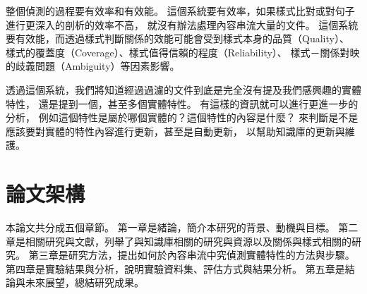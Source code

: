 整個偵測的過程要有效率和有效能。
這個系統要有效率，如果樣式比對或對句子進行更深入的剖析的效率不高，
就沒有辦法處理內容串流大量的文件。
這個系統要有效能，而透過樣式判斷關係的效能可能會受到樣式本身的品質（Quality）、
樣式的覆蓋度（Coverage）、樣式值得信賴的程度（Reliability）、
樣式－關係對映的歧義問題（Ambiguity）等因素影響。

透過這個系統，我們將知道經過過濾的文件到底是完全沒有提及我們感興趣的實體特性，
還是提到一個，甚至多個實體特性。
有這樣的資訊就可以進行更進一步的分析，
例如這個特性是屬於哪個實體的？這個特性的內容是什麼？
來判斷是不是應該要對實體的特性內容進行更新，甚至是自動更新，
以幫助知識庫的更新與維護。

%
%
\section{論文架構}
本論文共分成五個章節。
第一章是緒論，簡介本研究的背景、動機與目標。
第二章是相關研究與文獻，列舉了與知識庫相關的研究與資源以及關係與樣式相關的研究。
第三章是研究方法，提出如何於內容串流中究偵測實體特性的方法與步驟。
第四章是實驗結果與分析，說明實驗資料集、評估方式與結果分析。
第五章是結論與未來展望，總結研究成果。
